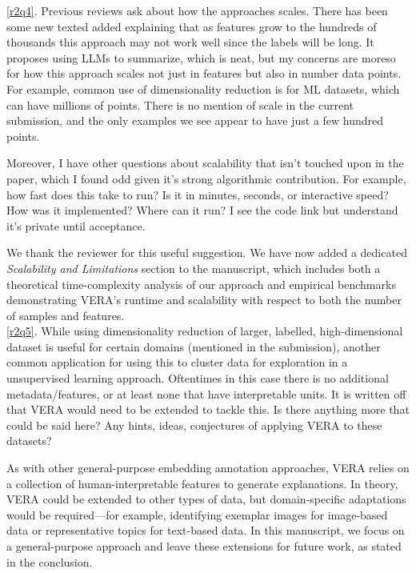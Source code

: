 \documentclass[11pt]{article}
\newcounter{rtaskno}
\newcommand{\rtask}[1]{\refstepcounter{rtaskno}\label{#1}}
\newcommand{\reviewc}[2]{\begin{leftbar}\noindent\rtask{#1}\ref{#1}. #2\end{leftbar}\vspace*{-4mm}}
\newcommand{\answer}[1]{\noindent #1\\[8mm]}
\newlength{\leftbarwidth}
\newlength{\leftbarsep}
\renewenvironment{leftbar}{%
    \def\FrameCommand{{\color{black}{\vrule width \leftbarwidth\relax\hspace {\leftbarsep}}}}%
    \MakeFramed {\advance \hsize -\width \FrameRestore }%
}{\endMakeFramed}
\begin{document}



\reviewc{r2q4}{Previous reviews ask about how the approaches scales. There has been some new texted added explaining that as features grow to the hundreds of thousands this approach may not work well since the labels will be long. It proposes using LLMs to summarize, which is neat, but my concerns are moreso for how this approach scales not just in features but also in number data points. For example, common use of dimensionality reduction is for ML datasets, which can have millions of points. There is no mention of scale in the current submission, and the only examples we see appear to have just a few hundred points.

Moreover, I have other questions about scalability that isn't touched upon in the paper, which I found odd given it's strong algorithmic contribution. For example, how fast does this take to run? Is it in minutes, seconds, or interactive speed? How was it implemented? Where can it run? I see the code link but understand it's private until acceptance.}

\answer{We thank the reviewer for this useful suggestion. We have now added a dedicated \textit{Scalability and Limitations} section to the manuscript, which includes both a theoretical time-complexity analysis of our approach and empirical benchmarks demonstrating VERA’s runtime and scalability with respect to both the number of samples and features.}


\reviewc{r2q5}{While using dimensionality reduction of larger, labelled, high-dimensional dataset is useful for certain domains (mentioned in the submission), another common application for using this to cluster data for exploration in a unsupervised learning approach. Oftentimes in this case there is no additional metadata/features, or at least none that have interpretable units. It is written off that VERA would need to be extended to tackle this. Is there anything more that could be said here? Any hints, ideas, conjectures of applying VERA to these datasets?}

\answer{As with other general-purpose embedding annotation approaches, VERA relies on a collection of human-interpretable features to generate explanations. In theory, VERA could be extended to other types of data, but domain-specific adaptations would be required—for example, identifying exemplar images for image-based data or representative topics for text-based data. In this manuscript, we focus on a general-purpose approach and leave these extensions for future work, as stated in the conclusion.}
\end{document}
